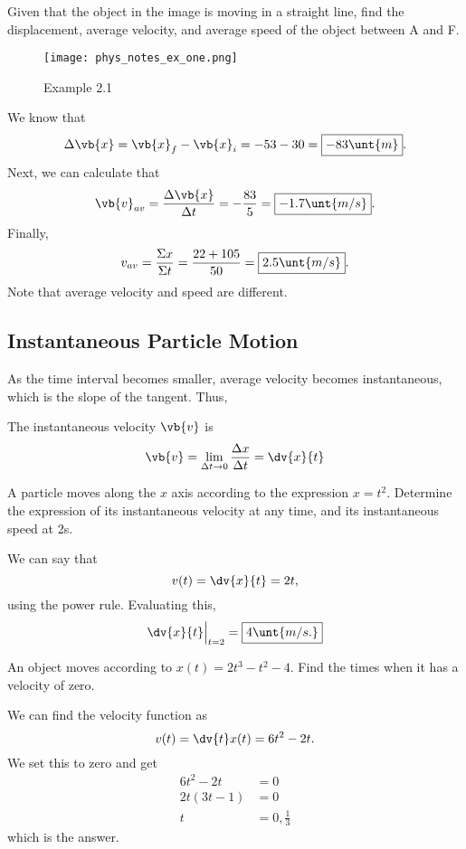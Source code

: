 \documentclass[11pt]{article}
\begin{document}
\begin{example}
	Given that the object in the image is moving in a straight line, find the displacement, average velocity, and average speed of the object between A and F.
\end{example}

\begin{figure}[h!t]
	\centering
	\texttt{[image: phys\_notes\_ex\_one.png]}
	\caption{Example 2.1}
\end{figure}

\begin{solution}
	We know that
	\[\Delta \vb{x} = \vb{x}_f - \vb{x}_i = -53 - 30 = \boxed{-83\unt{m}}.\]
	Next, we can calculate that
	\[\vb{v}_{av} = \frac{\Delta \vb{x}}{\Delta t} = -\frac{83}{5} = \boxed{-1.7 \unt{m/s}}.\]	
	Finally,
	\[v_{av} = \frac{\Sigma x}{\Sigma t} = \frac{22 + 105}{50} = \boxed{2.5 \unt{m/s}}.\]
	Note that average velocity and speed are different.
\end{solution}

\subsection{Instantaneous Particle Motion}
As the time interval becomes smaller, average velocity becomes instantaneous, which is the slope of the tangent. Thus,

\begin{defn}
	The instantaneous velocity $\vb{v}$ is
	\[\vb{v} = \lim_{\Delta t \to 0} \frac{\Delta x}{\Delta t} = \dv{x}{t}\]
\end{defn}

\begin{example}
	A particle moves along the $x$ axis according to the expression $x = t^2$. Determine the expression of its instantaneous velocity at any time, and its instantaneous speed at 2s.
\end{example}
\begin{solution}
	We can say that
	\[v(t) = \dv{x}{t} = 2t,\]
	using the power rule. Evaluating this,
	\[\dv{x}{t}\Big|_{t = 2} = \boxed{4 \unt{m/s.}}\]
\end{solution}

\begin{example}
	An object moves according to $x(t) = 2t^3 - t^2 - 4.$ Find the times when it has a velocity of zero.
\end{example}
\begin{solution}
	We can find the velocity function as
	\[v(t) = \dv{t} x(t) = 6t^2 - 2t.\] 
	We set this to zero and get
	\begin{align*}
		6t^2 - 2t &= 0 \\
		2t(3t-1) &= 0 \\
		t &= \boxed{0, \frac{1}{3}}
	\end{align*}
	which is the answer.
\end{solution}
\end{document}
